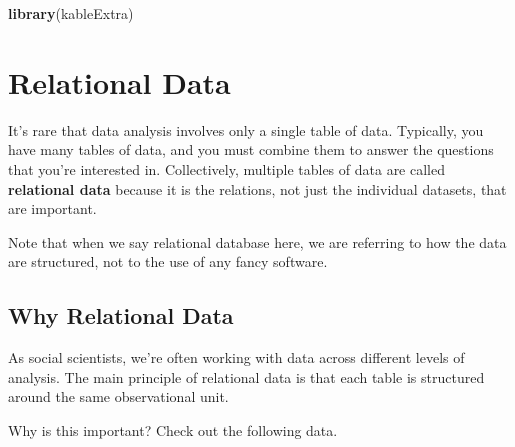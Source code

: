 \documentclass[]{book}
\newenvironment{Shaded}{\begin{snugshade}}{\end{snugshade}}
\newcommand{\KeywordTok}[1]{\textcolor[rgb]{0.13,0.29,0.53}{\textbf{#1}}}
\newcommand{\NormalTok}[1]{#1}
\begin{document}
\begin{Shaded}
\begin{Highlighting}[]
\KeywordTok{library}\NormalTok{(kableExtra)}
\end{Highlighting}
\end{Shaded}

\hypertarget{relational-data}{%
\chapter{Relational Data}\label{relational-data}}

It's rare that data analysis involves only a single table of data. Typically, you have many tables of data, and you must combine them to answer the questions that you're interested in. Collectively, multiple tables of data are called \textbf{relational data} because it is the relations, not just the individual datasets, that are important.

Note that when we say relational database here, we are referring to how the data are structured, not to the use of any fancy software.

\hypertarget{why-relational-data}{%
\section{Why Relational Data}\label{why-relational-data}}

As social scientists, we're often working with data across different levels of analysis. The main principle of relational data is that each table is structured around the same observational unit.

Why is this important? Check out the following data.
\end{document}
